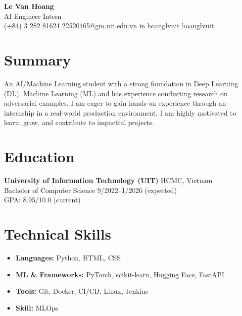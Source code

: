 \documentclass{article}
\begin{document}
\begin{center}
    \huge \textbf{Le Van Hoang} \\
    \large AI Engineer Intern \\
    \vspace{10pt}
    \href{tel:+84328281624}{(+84) 3 282 81624}
    \textbullet
    \href{mailto:22520465@gm.uit.edu.vn}{22520465@gm.uit.edu.vn}
    \textbullet
    \href{https://www.linkedin.com/in/hoanglvuit}{in hoanglvuit}
    \textbullet
    \href{https://github.com/hoanglvuit}{hoanglvuit}
\end{center}

\section*{Summary}
An AI/Machine Learning student with a strong foundation in Deep Learning (DL), Machine Learning (ML) and has experience conducting research on adversarial examples. I am eager to gain hands-on experience through an internship in a real-world production environment. I am highly motivated to learn, grow, and contribute to impactful projects.

\section*{Education}
\textbf{University of Information Technology (UIT)} \hfill HCMC, Vietnam \\
Bachelor of Computer Science \hfill 9/2022--1/2026 (expected) \\
GPA: 8.95/10.0 (current)

\section*{Technical Skills}
\begin{itemize}
    \item \textbf{Languages:} Python, HTML, CSS
    \item \textbf{ML \& Frameworks:} PyTorch, scikit-learn, Hugging Face, FastAPI
    \item \textbf{Tools:} Git, Docker, CI/CD, Linux, Jenkins
    \item \textbf{Skill:} MLOps
\end{itemize}
\end{document}
